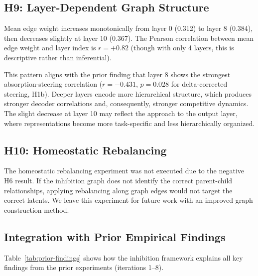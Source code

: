 \documentclass{article}
\begin{document}
\subsection{H9: Layer-Dependent Graph Structure}
\label{sec:h9}

Mean edge weight increases monotonically from layer 0 (0.312) to layer 8 (0.384), then decreases slightly at layer 10 (0.367). The Pearson correlation between mean edge weight and layer index is $r = +0.82$ (though with only 4 layers, this is descriptive rather than inferential).

This pattern aligns with the prior finding that layer 8 shows the strongest absorption-steering correlation ($r = -0.431$, $p = 0.028$ for delta-corrected steering, H1b). Deeper layers encode more hierarchical structure, which produces stronger decoder correlations and, consequently, stronger competitive dynamics. The slight decrease at layer 10 may reflect the approach to the output layer, where representations become more task-specific and less hierarchically organized.

\subsection{H10: Homeostatic Rebalancing}
\label{sec:h10}

The homeostatic rebalancing experiment was not executed due to the negative H6 result. If the inhibition graph does not identify the correct parent-child relationships, applying rebalancing along graph edges would not target the correct latents. We leave this experiment for future work with an improved graph construction method.

\subsection{Integration with Prior Empirical Findings}
\label{sec:integration}

Table~\ref{tab:prior-findings} shows how the inhibition framework explains all key findings from the prior experiments (iterations 1--8).
\end{document}
